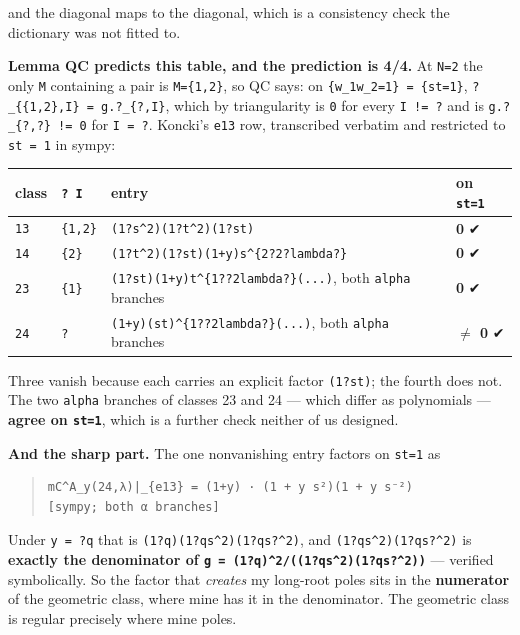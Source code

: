 \documentclass[11pt,a4paper]{article}
\begin{document}
and the diagonal maps to the diagonal, which is a consistency check the dictionary was not fitted to.

\textbf{Lemma QC predicts this table, and the prediction is 4/4.} At \mbox{\texttt{N=2}} the only \mbox{\texttt{M}} containing a pair is \mbox{\texttt{M=\{1,2\}}}, so QC says: on \mbox{\texttt{\{w\_1w\_2=1\} = \{st=1\}}}, \mbox{\texttt{?\_\{\{1,2\},I\} = g.?\_\{?,I\}}}, which by triangularity is \mbox{\texttt{0}} for every \mbox{\texttt{I != ?}} and is \mbox{\texttt{g.?\_\{?,?\} != 0}} for \mbox{\texttt{I = ?}}. Koncki's \mbox{\texttt{e13}} row, transcribed verbatim and restricted to \mbox{\texttt{st = 1}} in sympy:

\begin{center}\footnotesize
\begin{tabular}{@{}p{}p{}p{}p{}@{}}
\hline
\textbf{class} & \textbf{\mbox{\texttt{? I}}} & \textbf{entry} & \textbf{on \mbox{\texttt{st=1}}}\\ \hline
\mbox{\texttt{13}} & \mbox{\texttt{\{1,2\}}} & \mbox{\texttt{(1?s\textasciicircum{}2)(1?t\textasciicircum{}2)(1?st)}} & \textbf{0} ✔\\
\mbox{\texttt{14}} & \mbox{\texttt{\{2\}}} & \mbox{\texttt{(1?t\textasciicircum{}2)(1?st)(1+y)s\textasciicircum{}\{2?2?lambda?\}}} & \textbf{0} ✔\\
\mbox{\texttt{23}} & \mbox{\texttt{\{1\}}} & \mbox{\texttt{(1?st)(1+y)t\textasciicircum{}\{1??2lambda?\}(...)}}, both \mbox{\texttt{alpha}} branches & \textbf{0} ✔\\
\mbox{\texttt{24}} & \mbox{\texttt{?}} & \mbox{\texttt{(1+y)(st)\textasciicircum{}\{1??2lambda?\}(...)}}, both \mbox{\texttt{alpha}} branches & \textbf{$\neq$ 0} ✔\\
\hline\end{tabular}\end{center}

Three vanish because each carries an explicit factor \mbox{\texttt{(1?st)}}; the fourth does not. The two \mbox{\texttt{alpha}} branches of classes 23 and 24 --- which differ as polynomials --- \textbf{agree on \mbox{\texttt{st=1}}}, which is a further check neither of us designed.

\textbf{And the sharp part.} The one nonvanishing entry factors on \mbox{\texttt{st=1}} as
\begin{quote}\footnotesize\begin{verbatim}
mC^A_y(24,λ)|_{e13} = (1+y) · (1 + y s²)(1 + y s⁻²)        [sympy; both α branches]
\end{verbatim}\end{quote}
Under \mbox{\texttt{y = ?q}} that is \mbox{\texttt{(1?q)(1?qs\textasciicircum{}2)(1?qs?\textasciicircum{}2)}}, and \mbox{\texttt{(1?qs\textasciicircum{}2)(1?qs?\textasciicircum{}2)}} is \textbf{exactly the denominator of \mbox{\texttt{g = (1?q)\textasciicircum{}2/((1?qs\textasciicircum{}2)(1?qs?\textasciicircum{}2))}}} --- verified symbolically. So the factor that \emph{creates} my long-root poles sits in the \textbf{numerator} of the geometric class, where mine has it in the denominator. The geometric class is regular precisely where mine poles.
\end{document}
